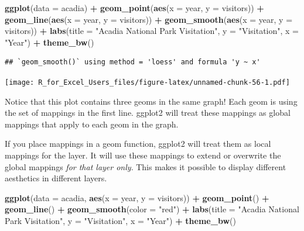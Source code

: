 \documentclass[]{book}
\newenvironment{Shaded}{\begin{snugshade}}{\end{snugshade}}
\newcommand{\DataTypeTok}[1]{\textcolor[rgb]{0.13,0.29,0.53}{#1}}
\newcommand{\KeywordTok}[1]{\textcolor[rgb]{0.13,0.29,0.53}{\textbf{#1}}}
\newcommand{\NormalTok}[1]{#1}
\newcommand{\OperatorTok}[1]{\textcolor[rgb]{0.81,0.36,0.00}{\textbf{#1}}}
\newcommand{\StringTok}[1]{\textcolor[rgb]{0.31,0.60,0.02}{#1}}
\begin{document}
\begin{Shaded}
\begin{Highlighting}[]
\KeywordTok{ggplot}\NormalTok{(}\DataTypeTok{data =}\NormalTok{ acadia) }\OperatorTok{+}\StringTok{ }
\StringTok{  }\KeywordTok{geom_point}\NormalTok{(}\KeywordTok{aes}\NormalTok{(}\DataTypeTok{x =}\NormalTok{ year, }\DataTypeTok{y =}\NormalTok{ visitors)) }\OperatorTok{+}
\StringTok{  }\KeywordTok{geom_line}\NormalTok{(}\KeywordTok{aes}\NormalTok{(}\DataTypeTok{x =}\NormalTok{ year, }\DataTypeTok{y =}\NormalTok{ visitors)) }\OperatorTok{+}
\StringTok{  }\KeywordTok{geom_smooth}\NormalTok{(}\KeywordTok{aes}\NormalTok{(}\DataTypeTok{x =}\NormalTok{ year, }\DataTypeTok{y =}\NormalTok{ visitors)) }\OperatorTok{+}
\StringTok{  }\KeywordTok{labs}\NormalTok{(}\DataTypeTok{title =} \StringTok{"Acadia National Park Visitation"}\NormalTok{,}
       \DataTypeTok{y =} \StringTok{"Visitation"}\NormalTok{,}
       \DataTypeTok{x =} \StringTok{"Year"}\NormalTok{) }\OperatorTok{+}
\StringTok{  }\KeywordTok{theme_bw}\NormalTok{()}
\end{Highlighting}
\end{Shaded}

\begin{verbatim}
## `geom_smooth()` using method = 'loess' and formula 'y ~ x'
\end{verbatim}

\texttt{[image: R\_for\_Excel\_Users\_files/figure-latex/unnamed-chunk-56-1.pdf]}

Notice that this plot contains three geoms in the same graph! Each geom is using the set of mappings in the first line. ggplot2 will treat these mappings as global mappings that apply to each geom in the graph.

If you place mappings in a geom function, ggplot2 will treat them as local mappings for the layer. It will use these mappings to extend or overwrite the global mappings \emph{for that layer only}. This makes it possible to display different aesthetics in different layers.

\begin{Shaded}
\begin{Highlighting}[]
\KeywordTok{ggplot}\NormalTok{(}\DataTypeTok{data =}\NormalTok{ acadia, }\KeywordTok{aes}\NormalTok{(}\DataTypeTok{x =}\NormalTok{ year, }\DataTypeTok{y =}\NormalTok{ visitors)) }\OperatorTok{+}\StringTok{ }
\StringTok{  }\KeywordTok{geom_point}\NormalTok{() }\OperatorTok{+}
\StringTok{  }\KeywordTok{geom_line}\NormalTok{() }\OperatorTok{+}
\StringTok{  }\KeywordTok{geom_smooth}\NormalTok{(}\DataTypeTok{color =} \StringTok{"red"}\NormalTok{) }\OperatorTok{+}
\StringTok{  }\KeywordTok{labs}\NormalTok{(}\DataTypeTok{title =} \StringTok{"Acadia National Park Visitation"}\NormalTok{,}
       \DataTypeTok{y =} \StringTok{"Visitation"}\NormalTok{,}
       \DataTypeTok{x =} \StringTok{"Year"}\NormalTok{) }\OperatorTok{+}
\StringTok{  }\KeywordTok{theme_bw}\NormalTok{()}
\end{Highlighting}
\end{Shaded}
\end{document}
